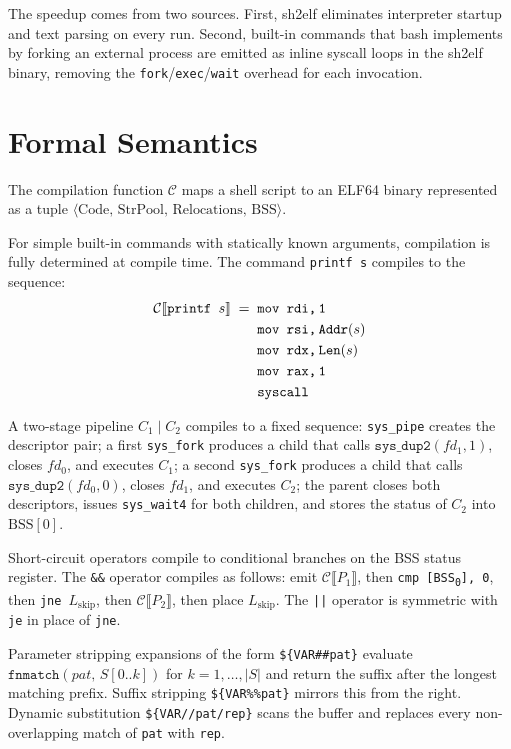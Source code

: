 \documentclass[10pt,twocolumn]{article}
\begin{document}
The speedup comes from two sources. First, sh2elf eliminates
interpreter startup and text parsing on every run. Second, built-in
commands that bash implements by forking an external process are
emitted as inline syscall loops in the sh2elf binary, removing the
\texttt{fork}/\texttt{exec}/\texttt{wait} overhead for each
invocation.


\section{Formal Semantics}

The compilation function $\mathcal{C}$ maps a shell script to an ELF64
binary represented as a tuple
$\langle \text{Code},\, \text{StrPool},\, \text{Relocations},\,
\text{BSS} \rangle$.

For simple built-in commands with statically known arguments,
compilation is fully determined at compile time. The command
\texttt{printf~s} compiles to the sequence:
\begin{align*}
\mathcal{C}\llbracket \texttt{printf~}s \rrbracket \;=\;\;
  &\texttt{mov~rdi,\,1} \\
  &\texttt{mov~rsi,\,Addr}(s) \\
  &\texttt{mov~rdx,\,Len}(s) \\
  &\texttt{mov~rax,\,1} \\
  &\texttt{syscall}
\end{align*}

A two-stage pipeline $C_1 \mid C_2$ compiles to a fixed sequence:
\texttt{sys\_pipe} creates the descriptor pair; a first
\texttt{sys\_fork} produces a child that calls
$\texttt{sys\_dup2}(fd_1, 1)$, closes $fd_0$, and executes $C_1$; a
second \texttt{sys\_fork} produces a child that calls
$\texttt{sys\_dup2}(fd_0, 0)$, closes $fd_1$, and executes $C_2$; the
parent closes both descriptors, issues \texttt{sys\_wait4} for both
children, and stores the status of $C_2$ into $\mathrm{BSS}[0]$.

Short-circuit operators compile to conditional branches on the BSS
status register. The \texttt{\&\&} operator compiles as follows:
emit $\mathcal{C}\llbracket P_1 \rrbracket$, then
\texttt{cmp~[BSS\textsubscript{0}],\,0}, then
\texttt{jne~}$L_\text{skip}$, then
$\mathcal{C}\llbracket P_2 \rrbracket$, then place $L_\text{skip}$.
The \texttt{||} operator is symmetric with \texttt{je} in place of
\texttt{jne}.

Parameter stripping expansions of the form \texttt{\$\{VAR\#\#pat\}}
evaluate $\texttt{fnmatch}(pat,\, S[0..k])$ for $k = 1,\ldots,|S|$
and return the suffix after the longest matching prefix. Suffix
stripping \texttt{\$\{VAR\%\%pat\}} mirrors this from the right.
Dynamic substitution \texttt{\$\{VAR//pat/rep\}} scans the buffer and
replaces every non-overlapping match of \texttt{pat} with \texttt{rep}.
\end{document}
